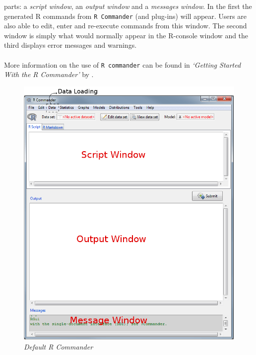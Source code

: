 \documentclass[a4paper]{article}\usepackage[]{graphicx}\usepackage[]{color}
\begin{document}
parts: a {\it script window}, an {\it output window} and a {\it messages
window}.
In the first the generated R commands from \verb|R Commander| (and plug-ins)
will appear. Users are also able to edit, enter and re-execute commands from
this window. The second window is simply what would normally appear in the
R-console window and the third displays error messages and warnings.
\\ \\
More information on the use of \verb|R commander| can be found in {\it `Getting
Started With the R Commander'} by \citet{Fox2007}.
\begin{figure}[H]
\centering
\includegraphics[scale=0.4]{figures/rcmdrwindow.png}
\caption{{\it Default R Commander}\label{rcmdrwindow}}
\end{figure}



\end{document}
